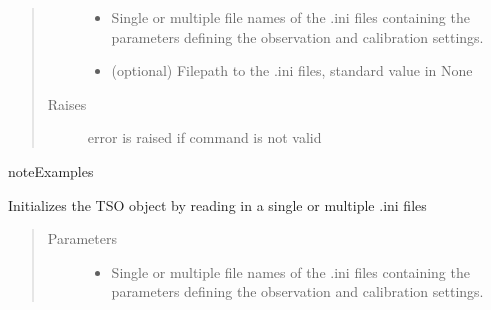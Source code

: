 \documentclass[a4paper,11pt,english]{sphinxmanual}
\begin{document}
\begin{fulllineitems}
\begin{fulllineitems}
\begin{quote}
\begin{description}
\begin{itemize}
\item {} 
 \textendash{} Single or multiple file names of the .ini files containing the
parameters defining the observation and calibration settings.

\item {} 
 \textendash{} (optional) Filepath to the .ini files, standard value in None

\end{itemize}

\item[{Raises}] \leavevmode
{} \textendash{} error is raised if command is not valid

\end{description}\end{quote}

\begin{sphinxadmonition}{note}{Examples}

%
\begin{sphinxVerbatim}[commandchars=\\\{\}]
\end{sphinxVerbatim}
\end{sphinxadmonition}

\end{fulllineitems}


\begin{fulllineitems}
\label{\detokenize{cascade.TSO:cascade.TSO.TSO.TSOSuite.initialize_TSO}}
Initializes the TSO object by reading in a single or
multiple .ini files
\begin{quote}\begin{description}
\item[{Parameters}] \leavevmode\begin{itemize}
\item {} 
 \textendash{} Single or multiple file names of the .ini files containing the
parameters defining the observation and calibration settings.


\end{itemize}
\end{description}
\end{quote}
\end{fulllineitems}
\end{fulllineitems}
\end{document}
